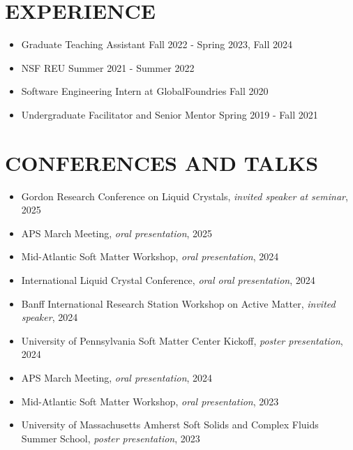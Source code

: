 \documentclass[margin, 10pt]{res} %
\begin{document}
\begin{resume}
\section{EXPERIENCE}
\begin{itemize}
 \item Graduate Teaching Assistant \hfill Fall 2022 - Spring 2023, Fall 2024
 \item NSF REU \hfill Summer 2021 - Summer 2022
 \item Software Engineering Intern at GlobalFoundries \hfill Fall 2020
\item Undergraduate Facilitator and Senior Mentor \hfill Spring 2019 - Fall 2021
\end{itemize}

\section{CONFERENCES AND TALKS}
\begin{itemize}
    \item Gordon Research Conference on Liquid Crystals, {\it invited speaker at seminar}, 2025
    \item APS March Meeting, {\it oral presentation}, 2025
    \item Mid-Atlantic Soft Matter Workshop, {\it oral presentation}, 2024
    \item International Liquid Crystal Conference, {\it oral oral presentation}, 2024
    \item Banff International Research Station Workshop on Active Matter, {\it invited speaker}, 2024
    \item University of Pennsylvania Soft Matter Center Kickoff, {\it poster presentation}, 2024
    \item APS March Meeting, {\it oral presentation}, 2024
    \item Mid-Atlantic Soft Matter Workshop, {\it oral presentation}, 2023
    \item University of Massachusetts Amherst Soft Solids and Complex Fluids Summer School, {\it poster presentation}, 2023
\end{itemize}
    

\end{resume}
\end{document}
